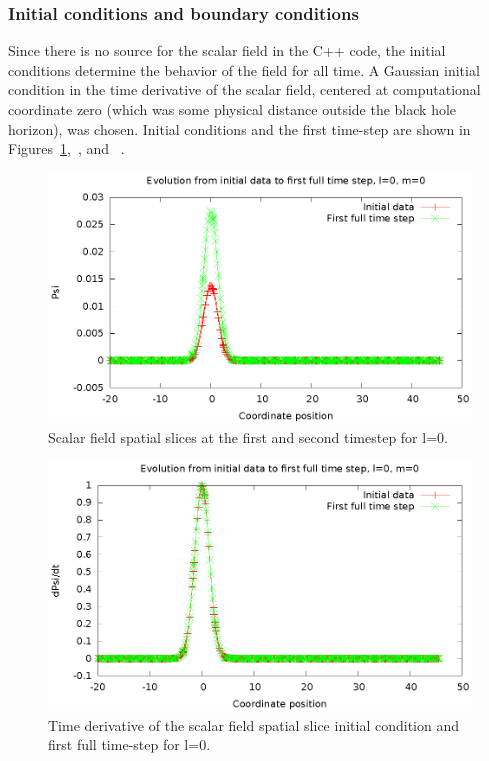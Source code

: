   



\subsubsection{Initial conditions and boundary conditions}
Since there is no source for the scalar field in the C++ code, the initial conditions determine the behavior of the field for all time. A Gaussian initial condition in the time derivative of the scalar field, centered at computational coordinate zero (which was some physical distance outside the black hole horizon), was chosen. Initial conditions and the first time-step are shown in Figures~\ref{psi0},~\cite{rho0}, and ~\cite{phi0}.


\begin{figure}
  \includegraphics{psi1dl0}
  \caption{Scalar field spatial slices at the first and second timestep for l=0.}
  \label{psi0}
\end{figure}

\begin{figure}
  \includegraphics{rho1dl0}
  \caption{Time derivative of the scalar field spatial slice initial condition and first full time-step for l=0.}
  \label{rho0}
\end{figure}

